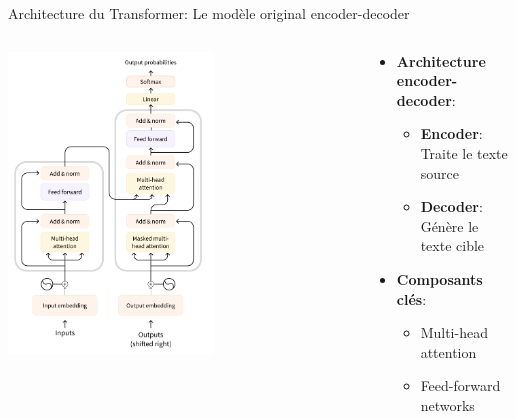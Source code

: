 \documentclass[aspectratio=169]{beamer}
\begin{document}
\begin{frame}{Architecture du Transformer: Le modèle original encoder-decoder}
    \begin{columns}
        \begin{column}{0.5\textwidth}
            \begin{center}
                \includegraphics[width=0.6\textwidth, keepaspectratio]{images/transformers.png}
            \end{center}
        \end{column}
        \begin{column}{0.5\textwidth}
            \begin{itemize}
                \item \textbf{Architecture encoder-decoder}:
                \begin{itemize}
                    \item \textbf{Encoder}: Traite le texte source
                    \item \textbf{Decoder}: Génère le texte cible
                \end{itemize}
                \vspace{0.2cm}
                \item \textbf{Composants clés}:
                \begin{itemize}
                    \item Multi-head attention
                    \item Feed-forward networks

\end{itemize}
\end{itemize}
\end{column}
\end{columns}
\end{frame}
\end{document}
